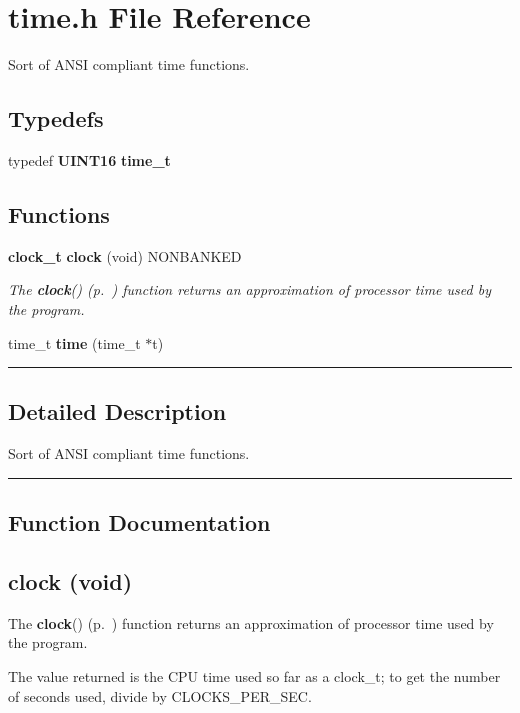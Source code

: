 \section{time.h File Reference}
\label{time.h}
Sort of ANSI compliant time functions. 


\subsection*{Typedefs}
\begin{CompactItemize}
\item 
\label{time.h_a3}
typedef {\bf UINT16} {\bf time\_\-t}
\end{CompactItemize}
\subsection*{Functions}
\begin{CompactItemize}
\item 
{\bf clock\_\-t} {\bf clock} (void) NONBANKED
\begin{CompactList}\small\item\em The {\bf clock}() {\rm (p.~\pageref{time.h_a1})} function returns an approximation of processor time used by the program.\item\end{CompactList}

\item 
\label{time.h_a2}
time\_\-t {\bf time} (time\_\-t $\ast$t)
\end{CompactItemize}
\vspace{0.4cm}\hrule\vspace{0.2cm}
\subsection*{Detailed Description}
Sort of ANSI compliant time functions.\vspace{0.4cm}\hrule\vspace{0.2cm}
\subsection*{Function Documentation}
\label{time.h_a1}
\subsection{ clock (void)}

The {\bf clock}() {\rm (p.~\pageref{time.h_a1})} function returns an approximation of processor time used by the program.

The value returned is the CPU time used so far as a clock\_\-t; to get the number of seconds used, divide by CLOCKS\_\-PER\_\-SEC. 